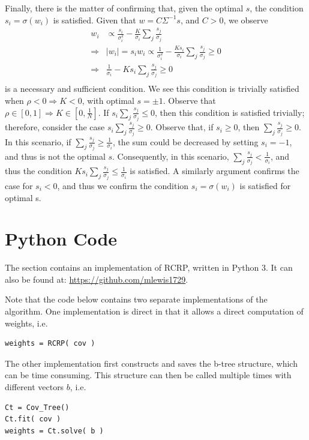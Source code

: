 \documentclass[10pt,twoside,titlepage]{article}   %
\begin{document}
Finally, there is the matter of confirming that, given the optimal $s$, 
the condition $s_i =  \sigma(w_i)$ is satisfied. 
Given that $w = C\Sigma^{-1}s$, and $C>0$, we observe
\begin{equation*}
\begin{aligned}
w_i &\propto \frac{ s_i }{ \sigma_i^2 } - \frac{ K }{ \sigma_i } \sum_j \frac{ s_j }{ \sigma_j } \\
\Rightarrow & | w_i | = s_i w_i \propto \frac{ 1 }{ \sigma_i^2 } - \frac{ K s_i }{ \sigma_i } \sum_j \frac{ s_j }{ \sigma_j } \geq 0 \\
\Rightarrow & \frac{ 1 }{ \sigma_i } - K s_i \sum_j \frac{ s_j }{ \sigma_j } \geq 0 \\
\end{aligned}
\end{equation*}
is a necessary and sufficient condition. We see this condition is 
trivially satisfied when $\rho < 0 \Rightarrow K<0$, 
with optimal $s=\pm 1$. 
Observe that $\rho \in [0,1] \Rightarrow K \in \left[ 0,\frac{1}{N} \right]$. 
If $s_i \sum_j \frac{s_j}{ \sigma_j} \leq 0$, 
then this condition is satisfied trivially; 
therefore, consider the case $s_i \sum_j \frac{ s_j }{ \sigma_j} \geq 0$.
Observe that, if $s_i \geq 0$, then $\sum_j \frac{s_j}{ \sigma_j} \geq 0$.
In this scenario, if $\sum_j \frac{s_j}{ \sigma_j} \geq \frac{1}{\sigma_i}$,
the sum could be decreased by setting $s_i=-1$, 
and thus is not the optimal $s$. 
Consequently, in this scenario, $\sum_j \frac{s_j}{ \sigma_j} < \frac{1}{\sigma_i}$, 
and thus the condition $K s_i \sum_j \frac{s_j}{\sigma_j} \leq \frac{1}{\sigma_i}$ is satisfied. 
A similarly argument confirms the case for $s_i<0$, and thus we confirm the condition 
$s_i=\sigma(w_i)$ is satisfied for optimal s.

\section{Python Code}\label{sec-AppendixCode}
The section contains an implementation of RCRP, written in Python 3.
It can also be found at: \url{https://github.com/mlewis1729}.

Note that the code below contains two separate implementations of the algorithm.
One implementation is direct in that it allows a direct computation of weights, i.e.

\begin{lstlisting}
weights = RCRP( cov )
\end{lstlisting}
The other implementation first constructs and saves the b-tree structure, which can be time consuming.
This structure can then be called multiple times with different vectors $b$, i.e.
\begin{lstlisting}
Ct = Cov_Tree()
Ct.fit( cov )
weights = Ct.solve( b )
\end{lstlisting}
\end{document}
